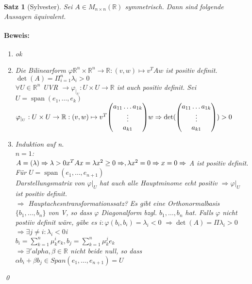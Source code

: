 \documentclass{report}
\newcommand{\lb}{\lambda}
\newcommand{\R}{\mathbb{R}}
\newcommand{\ve}[1]{{\begin{pmatrix}#1 \end{pmatrix}}}
\DeclareMathOperator{\Span}{span}
\theoremstyle{customrem}
\theoremstyle{customdef}
\newtheorem{satz}[definition]{Satz}
\renewenvironment{proof}{\paragraph{Beweis: }}{\qed}
\theoremstyle{customenv}
\begin{document}
\begin{satz}[Sylvester]
  Sei \(A \in M_{n \times n}(\R)\) symmetrisch. Dann sind folgende Aussagen \"aquivalent.

  \begin{proof}
    \begin{enumerate}
      \item[\(1 \Leftrightarrow 2\)] { ok }
      \item[\(1 \Rightarrow 3\)] {
        Die Bilinearform \(\varphi \R^n \times \R^n \to \R : (v, w) \mapsto v^T A w\) ist positiv definit.\\
        \(\det(A) = \Pi_{i=1}^n \lb_i > 0\)\\
        \(\forall U \in \R^n\) UVR \(\rightarrow \varphi_{|_U} : U \times U \to \R\) ist auch positiv definit.
        Sei \(U = \Span(e_1, \dots, e_k)\)\\
        \(\varphi_{|_U} : U \times U \to \R : (v, w) \mapsto v^T \ve{a_{11} \dots a_{1k}\\\vdots\\a_{k1}} w\\
        \Rightarrow \det( \ve{a_{11} \dots a_{1k}\\\vdots\\a_{k1}}) > 0\)
      }
      \item[\(3 \Rightarrow 1\)] {
        Induktion auf n.\\
        \(n=1\): \\
        \(A = (\lb) \Rightarrow \lb > 0\\
        x^T A x = \lb x^2 \ge 0 \Rightarrow, \lb  x^2 = 0 \Rightarrow x = 0 \Rightarrow\) A ist positiv definit.
        F\"ur \(U = \Span(e_1, \dots, e_{n+1})\)\\
        Darstellungsmatrix von \(\varphi|_U\) hat auch alle Hauptminome echt positiv \(\Rightarrow \varphi|_U\) ist positiv definit.\\
        \(\Rightarrow\) Hauptachesntransformationssatz?  Es gibt eine Orthonormalbasis \(\{b_1, \dots, b_n\}\) von V, so dass \(\varphi\)
        Diagonalform bzgl. \(b_1, \dots, b_n\) hat.
        Falls \(\varphi\) nicht postiiv definit w\"are, g\"abe es \(i : \varphi(b_i, b_i) = \lb_i < 0\)
        \(\Rightarrow \det(A) = \Pi \lb_i > 0\)\\
        \(\Rightarrow \exists j \neq i : \lb_i < 0\)i\\
        \(b_i = \sum_{k=1}^n \mu_k^i e_k, b_j = \sum_{k=1}^n \mu_k^j e_k\)\\
        \(\Rightarrow \exists 'alpha, \beta \in \R\) nicht beide null, so dass \(\alpha b_i + \beta b_j \in Span(e_1, \dots, e_{n+1}) = U\)\\
}
\end{enumerate}
\end{proof}
\end{satz}
\end{document}

